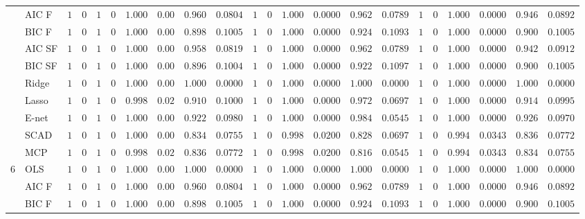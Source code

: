 \begin{tabular}{p{0.2cm}p{1cm}|p{0.6cm}p{0.6cm}|p{0.6cm}p{0.6cm}p{0.6cm}p{0.6cm}p{0.6cm}p{0.6cm}|p{0.6cm}p{0.6cm}p{0.6cm}p{0.6cm}p{0.6cm}p{0.6cm}|p{0.6cm}p{0.6cm}p{0.6cm}p{0.6cm}p{0.6cm}p{0.6cm}}
 & AIC F  & $1$ & $0$ & $1$ & $0$ & $1.000$ & $0.00$ & $0.960$ & $0.0804$ & $1$ & $0$ & $1.000$ & $0.0000$ & $0.962$ & $0.0789$ & $1$ & $0$ & $1.000$ & $0.0000$ & $0.946$ & $0.0892$ \\
 & BIC F  & $1$ & $0$ & $1$ & $0$ & $1.000$ & $0.00$ & $0.898$ & $0.1005$ & $1$ & $0$ & $1.000$ & $0.0000$ & $0.924$ & $0.1093$ & $1$ & $0$ & $1.000$ & $0.0000$ & $0.900$ & $0.1005$ \\
 & AIC SF  & $1$ & $0$ & $1$ & $0$ & $1.000$ & $0.00$ & $0.958$ & $0.0819$ & $1$ & $0$ & $1.000$ & $0.0000$ & $0.962$ & $0.0789$ & $1$ & $0$ & $1.000$ & $0.0000$ & $0.942$ & $0.0912$ \\
 & BIC SF  & $1$ & $0$ & $1$ & $0$ & $1.000$ & $0.00$ & $0.896$ & $0.1004$ & $1$ & $0$ & $1.000$ & $0.0000$ & $0.922$ & $0.1097$ & $1$ & $0$ & $1.000$ & $0.0000$ & $0.900$ & $0.1005$ \\
 & Ridge  & $1$ & $0$ & $1$ & $0$ & $1.000$ & $0.00$ & $1.000$ & $0.0000$ & $1$ & $0$ & $1.000$ & $0.0000$ & $1.000$ & $0.0000$ & $1$ & $0$ & $1.000$ & $0.0000$ & $1.000$ & $0.0000$ \\
 & Lasso  & $1$ & $0$ & $1$ & $0$ & $0.998$ & $0.02$ & $0.910$ & $0.1000$ & $1$ & $0$ & $1.000$ & $0.0000$ & $0.972$ & $0.0697$ & $1$ & $0$ & $1.000$ & $0.0000$ & $0.914$ & $0.0995$ \\
 & E-net  & $1$ & $0$ & $1$ & $0$ & $1.000$ & $0.00$ & $0.922$ & $0.0980$ & $1$ & $0$ & $1.000$ & $0.0000$ & $0.984$ & $0.0545$ & $1$ & $0$ & $1.000$ & $0.0000$ & $0.926$ & $0.0970$ \\
 & SCAD  & $1$ & $0$ & $1$ & $0$ & $1.000$ & $0.00$ & $0.834$ & $0.0755$ & $1$ & $0$ & $0.998$ & $0.0200$ & $0.828$ & $0.0697$ & $1$ & $0$ & $0.994$ & $0.0343$ & $0.836$ & $0.0772$ \\
 & MCP  & $1$ & $0$ & $1$ & $0$ & $0.998$ & $0.02$ & $0.836$ & $0.0772$ & $1$ & $0$ & $0.998$ & $0.0200$ & $0.816$ & $0.0545$ & $1$ & $0$ & $0.994$ & $0.0343$ & $0.834$ & $0.0755$ \\\hline
6 & OLS  & $1$ & $0$ & $1$ & $0$ & $1.000$ & $0.00$ & $1.000$ & $0.0000$ & $1$ & $0$ & $1.000$ & $0.0000$ & $1.000$ & $0.0000$ & $1$ & $0$ & $1.000$ & $0.0000$ & $1.000$ & $0.0000$ \\
 & AIC F  & $1$ & $0$ & $1$ & $0$ & $1.000$ & $0.00$ & $0.960$ & $0.0804$ & $1$ & $0$ & $1.000$ & $0.0000$ & $0.962$ & $0.0789$ & $1$ & $0$ & $1.000$ & $0.0000$ & $0.946$ & $0.0892$ \\
 & BIC F  & $1$ & $0$ & $1$ & $0$ & $1.000$ & $0.00$ & $0.898$ & $0.1005$ & $1$ & $0$ & $1.000$ & $0.0000$ & $0.924$ & $0.1093$ & $1$ & $0$ & $1.000$ & $0.0000$ & $0.900$ & $0.1005$ \\

\end{tabular}
